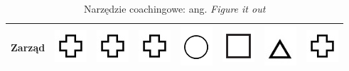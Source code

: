 \begin{table}[!ht]
  \centering
  \caption*{Narzędzie coachingowe: ang. \emph{Figure it out} }
  \def\arraystretch{2}%
  \begin{tabular}{|l|c|c|c|c|c|c|c|}
  \hline
  Zarząd & \includegraphics{img/s4} & \includegraphics{img/s4} & \includegraphics{img/s4}  & \includegraphics{img/s3} & \includegraphics{img/s2} & \includegraphics{img/s1} & \includegraphics{img/s4} \\ \hline

\end{tabular}
\end{table}
